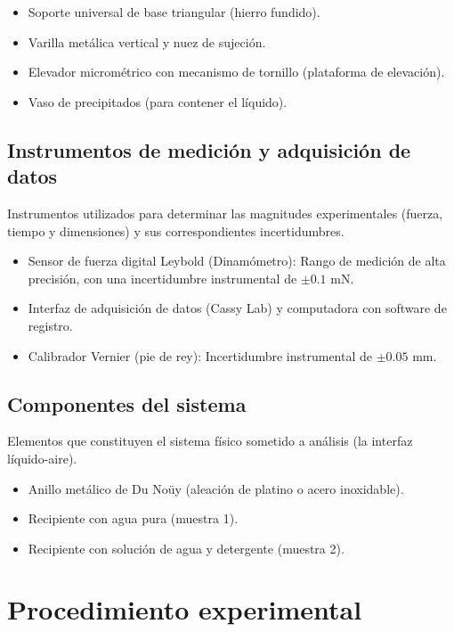 \documentclass[11pt,a4paper]{article}
\begin{document}
\begin{itemize}
    \item Soporte universal de base triangular (hierro fundido).
    \item Varilla metálica vertical y nuez de sujeción.
    \item Elevador micrométrico con mecanismo de tornillo (plataforma de elevación).
    \item Vaso de precipitados (para contener el líquido).
\end{itemize}

\subsection{Instrumentos de medición y adquisición de datos}

Instrumentos utilizados para determinar las magnitudes experimentales (fuerza, tiempo y dimensiones) y sus correspondientes incertidumbres.

\begin{itemize}
    \item Sensor de fuerza digital Leybold (Dinamómetro): Rango de medición de alta precisión, con una incertidumbre instrumental de \(\pm 0.1 \text{ mN}\).
    \item Interfaz de adquisición de datos (Cassy Lab) y computadora con software de registro.
    \item Calibrador Vernier (pie de rey): Incertidumbre instrumental de \(\pm 0.05 \text{ mm}\).
\end{itemize}

\subsection{Componentes del sistema}

Elementos que constituyen el sistema físico sometido a análisis (la interfaz líquido-aire).

\begin{itemize}
    \item Anillo metálico de Du Noüy (aleación de platino o acero inoxidable).
    \item Recipiente con agua pura (muestra 1).
    \item Recipiente con solución de agua y detergente (muestra 2).
\end{itemize}




\newpage
\section{Procedimiento experimental}
\end{document}
